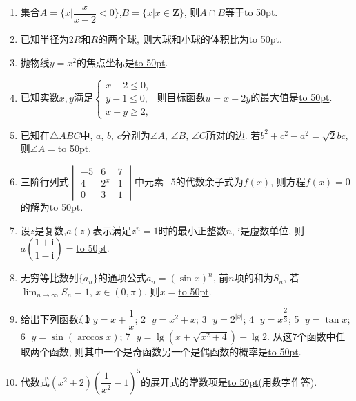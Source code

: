 \documentclass[10pt,a4paper]{article}
\newcommand{\blank}[1]{\underline{\hbox to #1pt{}}}
\begin{document}
\begin{enumerate}[1.]
\item 集合$A=\{x|\dfrac x{x-2}<0\}$,$B=\{x|x\in \mathbf{Z}\}$, 则$A\cap B$等于\blank{50}.
\item 已知半径为$2R$和$R$的两个球, 则大球和小球的体积比为\blank{50}.
\item 抛物线$y=x^2$的焦点坐标是\blank{50}.
\item 已知实数$x,y$满足$\begin{cases} x-2\le 0, \\ y-1\le 0, \\ x+y\ge 2,\end{cases}$ 则目标函数$u=x+2y$的最大值是\blank{50}.
\item 已知在$\triangle ABC$中, $a$, $b$, $c$分别为$\angle A$, $\angle B$, $\angle C$所对的边. 若$b^2+c^2-a^2=\sqrt{2}bc$, 则$\angle A=$\blank{50}.
\item 三阶行列式$\begin{vmatrix}-5 & 6 & 7  \\ 4 & 2^x & 1  \\ 0 & 3 & 1  \end{vmatrix}$中元素$-5$的代数余子式为$f(x)$, 则方程$f(x)=0$的解为\blank{50}.
\item 设$z$是复数,$a(z)$表示满足$z^n=1$时的最小正整数$n$, $\mathrm{i}$是虚数单位, 则$a(\dfrac{1+\mathrm{i}}{1-\mathrm{i}})=$\blank{50}.
\item 无穷等比数列$\{a_n\}$的通项公式$a_n=(\sin x)^n$, 前$n$项的和为$S_n$, 若$\displaystyle\lim_{n\to\infty}S_n=1$, $x\in (0,\pi)$, 则$x=$\blank{50}.
\item 给出下列函数: \textcircled{1} $y=x+\dfrac1x$; \textcircled{2} $y={x^2}+x$; \textcircled{3} $y={2^{|x|}}$; \textcircled{4} $y={x^{\dfrac23}}$; \textcircled{5} $y=\tan x$; \textcircled{6} $y=\sin(\arccos x)$; \textcircled{7} $y=\lg(x+\sqrt{{x^2}+4})-\lg 2$. 从这$7$个函数中任取两个函数, 则其中一个是奇函数另一个是偶函数的概率是\blank{50}.
\item 代数式$(x^2+2)(\dfrac1{x^2}-1)^5$的展开式的常数项是\blank{50}(用数字作答).



\end{enumerate}
\end{document}
